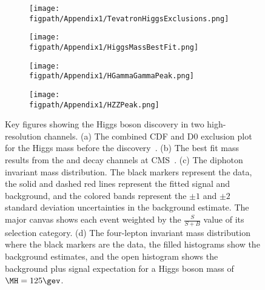 \begin{figure}[!hbt]
    \centering
    \begin{subfigure}[t]{0.48\textwidth}
        \texttt{[image: \\figpath/Appendix1/TevatronHiggsExclusions.png]}
        \caption{}
        \label{fig:TevatronHiggsExclusions}
    \end{subfigure}
    \begin{subfigure}[t]{0.48\textwidth}
        \texttt{[image: \\figpath/Appendix1/HiggsMassBestFit.png]}
        \caption{}
        \label{fig:HiggsMassBestFit}
    \end{subfigure}

    \begin{subfigure}[t]{0.52\textwidth}
        \texttt{[image: \\figpath/Appendix1/HGammaGammaPeak.png]}
        \caption{}
        \label{fig:HGammaGammaPeak}
    \end{subfigure}
    \begin{subfigure}[t]{0.44\textwidth}
        \texttt{[image: \\figpath/Appendix1/HZZPeak.png]}
        \caption{}
        \label{fig:HZZPeak}
    \end{subfigure}
    \caption{Key figures showing the Higgs boson discovery in two high-resolution channels. (a) The combined CDF and D0 exclusion plot for the Higgs mass before the discovery~\cite{PhysRevD.88.052014}. (b) The best fit mass results from the \GG and \ZZ decay channels at CMS~\cite{201230}. (c) The diphoton invariant mass distribution. The black markers represent the data, the solid and dashed red lines represent the fitted signal and background, and the colored bands represent the $\pm1$ and $\pm2$ standard deviation uncertainties in the background estimate. The major canvas shows each event weighted by the $\frac{S}{S+B}$ value of its selection category. (d) The four-lepton invariant mass distribution where the black markers are the data, the filled histograms show the background estimates, and the open histogram shows the background plus signal expectation for a Higgs boson mass of $\MH=125\gev$.}
    \label{fig:HiggsDiscovery}
\end{figure}

